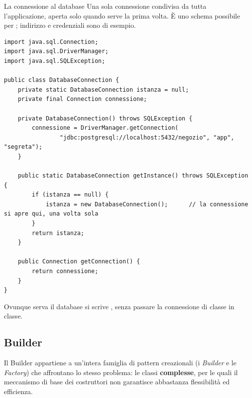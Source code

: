 \begin{esempio}{La connessione al database}
Una sola connessione condivisa da tutta l'applicazione, aperta solo quando serve la prima volta. È uno schema possibile
per ; indirizzo e credenziali sono di esempio.
\begin{lstlisting}[style=java, name=DatabaseConnection.java]
import java.sql.Connection;
import java.sql.DriverManager;
import java.sql.SQLException;

public class DatabaseConnection {
    private static DatabaseConnection istanza = null;
    private final Connection connessione;

    private DatabaseConnection() throws SQLException {
        connessione = DriverManager.getConnection(
                "jdbc:postgresql://localhost:5432/negozio", "app", "segreta");
    }

    public static DatabaseConnection getInstance() throws SQLException {
        if (istanza == null) {
            istanza = new DatabaseConnection();      // la connessione si apre qui, una volta sola
        }
        return istanza;
    }

    public Connection getConnection() {
        return connessione;
    }
}
\end{lstlisting}
Ovunque serva il database si scrive , senza passare la connessione
di classe in classe.
\end{esempio}


\subsection{Builder}

Il Builder appartiene a un'intera famiglia di pattern creazionali (i \textit{Builder} e le \textit{Factory}) che affrontano
lo stesso problema: le classi \textbf{complesse}, per le quali il meccanismo di base dei costruttori non garantisce
abbastanza flessibilità ed efficienza.

